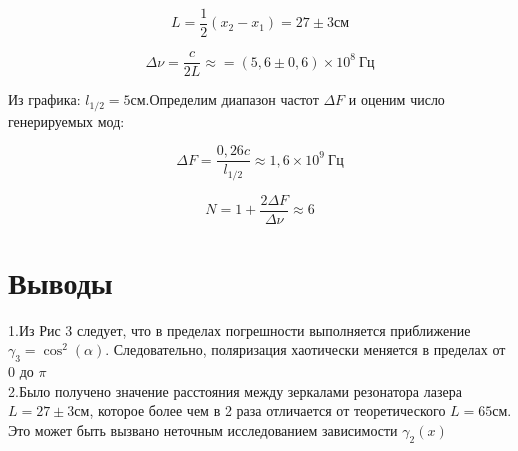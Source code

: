 \documentclass[a4paper,12pt]{article}
\begin{document}
$$
L = \frac{1}{2} (x_2 - x_1) = 27 \pm 3 см
$$

$$
\Delta \nu = \frac{c}{2L} \approx = (5,6 \pm 0,6) \times 10^8 \ Гц
$$

Из графика: $l_{1/2} = 5 см$.Определим диапазон частот $\Delta F$ и оценим число генерируемых мод:

$$
\Delta F = \frac{0,26c}{l_{1/2}} \approx 1,6 \times 10^9 \ Гц
$$

$$
N = 1 + \frac{2 \Delta F}{\Delta \nu} \approx 6
$$

\section*{Выводы}

1.Из Рис 3 следует, что в пределах погрешности выполняется приближение $\gamma_3 = \cos^2(\alpha)$. Следовательно, поляризация хаотически меняется в пределах от 0 до $\pi$	
\\
2.Было получено значение расстояния между зеркалами резонатора лазера $L = 27 \pm 3 см$, которое более чем в 2 раза отличается от теоретического $L = 65 см$. Это может быть вызвано неточным исследованием зависимости $\gamma_2(x)$
\end{document}
